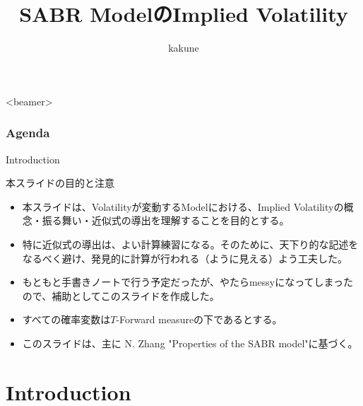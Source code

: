 \documentclass[dvipdfmx,9pt]{beamer}
\title{SABR ModelのImplied Volatility}
\author{kakune}
\begin{document}
\begin{frame}
  \titlepage
\end{frame}

\begin{frame}<beamer>
  \frametitle{Agenda}
  \tableofcontents
\end{frame}

\begin{frame}{Introduction}
  \begin{alertblock}{本スライドの目的と注意}
    \begin{itemize}
      \item 本スライドは、Volatilityが変動するModelにおける、Implied Volatilityの概念・振る舞い・近似式の導出を理解することを目的とする。
      \item 特に近似式の導出は、よい計算練習になる。そのために、天下り的な記述をなるべく避け、発見的に計算が行われる（ように見える）よう工夫した。
      \item もともと手書きノートで行う予定だったが、やたらmessyになってしまったので、補助としてこのスライドを作成した。
      \item すべての確率変数は$T$-Forward measureの下であるとする。
      \item このスライドは、主に N. Zhang "Properties of the SABR model"に基づく。
    \end{itemize}
  \end{alertblock}
\end{frame}

\section{Introduction}
\end{document}
